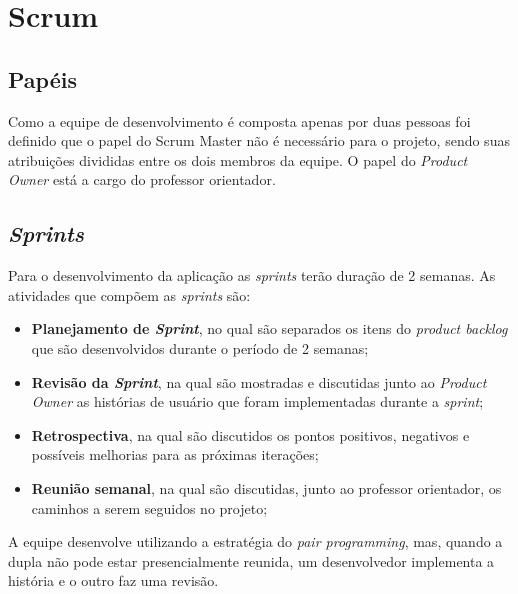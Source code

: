 \section{Scrum}

\subsection{Papéis}
Como a equipe de desenvolvimento é composta apenas por duas pessoas foi definido que o papel do Scrum Master não é necessário para o projeto, sendo suas atribuições divididas entre os dois membros da equipe. O papel do \textit{Product Owner} está a cargo do professor orientador.

\subsection{\textit{Sprints}}
Para o desenvolvimento da aplicação as \textit{sprints} terão duração de 2 semanas. As atividades que compõem as \textit{sprints} são:
\begin{itemize}
  \item \textbf{Planejamento de \textit{Sprint}}, no qual são separados os itens do \textit{product backlog} que são desenvolvidos durante o período de 2 semanas;
  \item \textbf{Revisão da \textit{Sprint}}, na qual são mostradas e discutidas junto ao \textit{Product Owner} as histórias de usuário que foram implementadas durante a \textit{sprint};
  \item \textbf{Retrospectiva}, na qual são discutidos os pontos positivos, negativos e possíveis melhorias para as próximas iterações;
  \item \textbf{Reunião semanal}, na qual são discutidas, junto ao professor orientador, os caminhos a serem seguidos no projeto;
\end{itemize}
A equipe desenvolve utilizando a estratégia do \textit{pair programming}, mas, quando a dupla não pode estar presencialmente reunida, um desenvolvedor implementa a história e o outro faz uma revisão.
